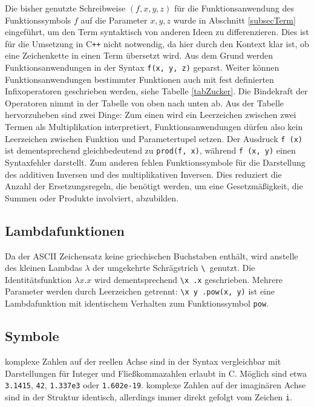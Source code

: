 Die bisher genutzte Schreibweise $(f, x, y, z)$ für die Funktionsanwendung des Funktionssymbols $f$ auf die Parameter $x, y, z$ wurde in Abschnitt \ref{subsecTerm} eingeführt, um den Term syntaktisch von anderen Ideen zu differenzieren. Dies ist für die Umsetzung in C\texttt{++} nicht notwendig, da hier durch den Kontext klar ist, ob eine Zeichenkette in einen Term übersetzt wird. Aus dem Grund werden Funktionsanwendungen in der Syntax \verb|f(x, y, z)| geparst. 
Weiter können Funktionsanwendungen bestimmter Funktionen auch mit fest definierten Infixoperatoren geschrieben werden, siehe Tabelle \ref{tabZucker}. Die Bindekraft der Operatoren nimmt in der Tabelle von oben nach unten ab.
Aus der Tabelle hervorzuheben sind zwei Dinge: Zum einen wird ein Leerzeichen zwischen zwei Termen als Multiplikation interpretiert, Funktionsanwendungen dürfen also kein Leerzeichen zwischen Funktion und Parametertupel setzen. Der Ausdruck \verb|f (x)| ist dementsprechend gleichbedeutend zu \verb|prod(f, x)|, während \verb|f (x, y)| einen Syntaxfehler darstellt. Zum anderen fehlen Funktionssymbole für die Darstellung des additiven Inversen und des multiplikativen Inversen. Dies reduziert die Anzahl der Ersetzungsregeln, die benötigt werden, um eine Gesetzmäßigkeit, die Summen oder Produkte involviert, abzubilden. 

\subsection{Lambdafunktionen} \label{subsubsecLambdaSyntax}
Da der ASCII Zeichensatz keine griechischen Buchstaben enthält, wird anstelle des kleinen Lambdas $\lambda$ der umgekehrte Schrägstrich \verb~\ ~genutzt. Die Identitätsfunktion $\lambda x.x$ wird dementsprechend \verb~\x .x~ geschrieben. Mehrere Parameter werden durch Leerzeichen getrennt: \verb~\x y .pow(x, y)~ ist eine Lambdafunktion mit identischem Verhalten zum Funktionssymbol \verb|pow|.

\subsection{Symbole}
komplexe Zahlen auf der reellen Achse sind in der Syntax vergleichbar mit Darstellungen für Integer und Fließkommazahlen erlaubt in C. Möglich sind etwa \verb|3.1415|, \verb|42|, \verb|1.337e3| oder \verb|1.602e-19|. komplexe Zahlen auf der imaginären Achse sind in der Struktur identisch, allerdings immer direkt gefolgt vom Zeichen \verb|i|. 


